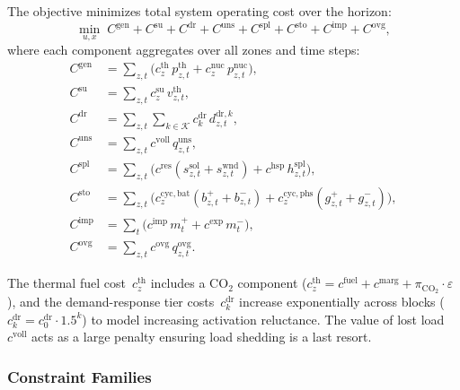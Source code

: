 \documentclass{article}
\begin{document}
The objective minimizes total system operating cost over the horizon:
\begin{equation}
\label{eq:objective}
\min_{u,x} \; C^{\mathrm{gen}} + C^{\mathrm{su}} + C^{\mathrm{dr}} + C^{\mathrm{uns}} + C^{\mathrm{spl}} + C^{\mathrm{sto}} + C^{\mathrm{imp}} + C^{\mathrm{ovg}},
\end{equation}
where each component aggregates over all zones and time steps:
\begin{align}
C^{\mathrm{gen}} &= \textstyle\sum_{z,t} \bigl( c^{\mathrm{th}}_z \, p^{\mathrm{th}}_{z,t} + c^{\mathrm{nuc}}_z \, p^{\mathrm{nuc}}_{z,t} \bigr), \label{eq:cost_gen} \\
C^{\mathrm{su}} &= \textstyle\sum_{z,t} c^{\mathrm{su}}_z \, v^{\mathrm{th}}_{z,t}, \label{eq:cost_startup} \\
C^{\mathrm{dr}} &= \textstyle\sum_{z,t} \sum_{k \in \mathcal{K}} c^{\mathrm{dr}}_k \, d^{\mathrm{dr},k}_{z,t}, \label{eq:cost_dr} \\
C^{\mathrm{uns}} &= \textstyle\sum_{z,t} c^{\mathrm{voll}} \, q^{\mathrm{uns}}_{z,t}, \label{eq:cost_uns} \\
C^{\mathrm{spl}} &= \textstyle\sum_{z,t} \bigl( c^{\mathrm{res}} (s^{\mathrm{sol}}_{z,t} + s^{\mathrm{wnd}}_{z,t}) + c^{\mathrm{hsp}} \, h^{\mathrm{spl}}_{z,t} \bigr), \label{eq:cost_spill} \\
C^{\mathrm{sto}} &= \textstyle\sum_{z,t} \bigl( c^{\mathrm{cyc,bat}}_z (b^{+}_{z,t} + b^{-}_{z,t}) + c^{\mathrm{cyc,phs}}_z (g^{+}_{z,t} + g^{-}_{z,t}) \bigr), \label{eq:cost_storage} \\
C^{\mathrm{imp}} &= \textstyle\sum_{t} \bigl( c^{\mathrm{imp}} \, m^{+}_{t} + c^{\mathrm{exp}} \, m^{-}_{t} \bigr), \label{eq:cost_trade} \\
C^{\mathrm{ovg}} &= \textstyle\sum_{z,t} c^{\mathrm{ovg}} \, q^{\mathrm{ovg}}_{z,t}. \label{eq:cost_overgen}
\end{align}

The thermal fuel cost~$c^{\mathrm{th}}_z$ includes a CO$_2$ component ($c^{\mathrm{th}}_z = c^{\mathrm{fuel}} + c^{\mathrm{marg}} + \pi_{\mathrm{CO}_2} \cdot \varepsilon$), and the demand-response tier costs~$c^{\mathrm{dr}}_k$ increase exponentially across blocks ($c^{\mathrm{dr}}_k = c^{\mathrm{dr}}_0 \cdot 1.5^{k}$) to model increasing activation reluctance. The value of lost load $c^{\mathrm{voll}}$ acts as a large penalty ensuring load shedding is a last resort.

\subsubsection{Constraint Families}
\label{sec:milp_constraints}
\end{document}
